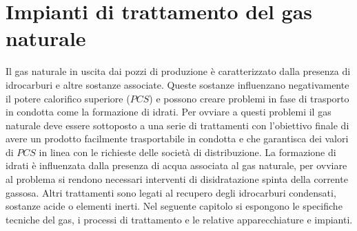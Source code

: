 \clearpage{\pagestyle{empty}\cleardoublepage}
\chapter{Impianti di trattamento del gas naturale}\thispagestyle{empty}
Il gas naturale in uscita dai pozzi di produzione è caratterizzato dalla presenza di idrocarburi e altre sostanze associate. Queste sostanze influenzano negativamente il potere calorifico superiore (\(PCS\)) e possono creare problemi in fase di trasporto in condotta come la formazione di idrati. Per ovviare a questi problemi il gas naturale deve essere sottoposto a una serie di trattamenti con l'obiettivo finale di avere un prodotto facilmente trasportabile in condotta e che garantisca dei valori di \(PCS\) in linea con le richieste delle società di distribuzione. La formazione di idrati è influenzata dalla presenza di acqua associata al gas naturale, per ovviare al problema si rendono necessari interventi di disidratazione spinta della corrente gassosa. Altri trattamenti sono legati al recupero degli idrocarburi condensati, sostanze acide o elementi inerti.
Nel seguente capitolo si espongono le specifiche tecniche del gas, i processi di trattamento e le relative apparecchiature e impianti.


